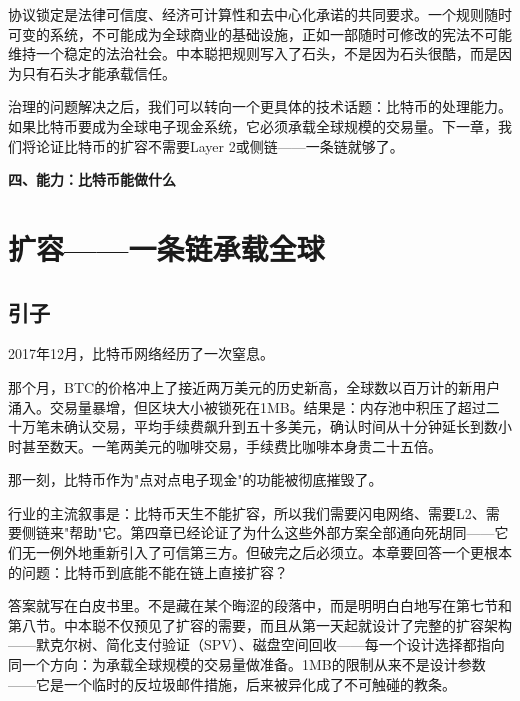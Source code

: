 \documentclass[a4paper,12pt,openany]{ctexbook}
\begin{document}
协议锁定是法律可信度、经济可计算性和去中心化承诺的共同要求。一个规则随时可变的系统，不可能成为全球商业的基础设施，正如一部随时可修改的宪法不可能维持一个稳定的法治社会。中本聪把规则写入了石头，不是因为石头很酷，而是因为只有石头才能承载信任。

治理的问题解决之后，我们可以转向一个更具体的技术话题：比特币的处理能力。如果比特币要成为全球电子现金系统，它必须承载全球规模的交易量。下一章，我们将论证比特币的扩容不需要Layer 2或侧链——一条链就够了。




\vspace{2em}
\begin{center}
{\Large\bfseries 四、能力：比特币能做什么}
\end{center}
\vspace{1em}



\chapter{扩容——一条链承载全球}



\section*{引子}


2017年12月，比特币网络经历了一次窒息。

那个月，BTC的价格冲上了接近两万美元的历史新高，全球数以百万计的新用户涌入。交易量暴增，但区块大小被锁死在1MB。结果是：内存池中积压了超过二十万笔未确认交易，平均手续费飙升到五十多美元，确认时间从十分钟延长到数小时甚至数天。一笔两美元的咖啡交易，手续费比咖啡本身贵二十五倍。

那一刻，比特币作为"点对点电子现金"的功能被彻底摧毁了。

行业的主流叙事是：比特币天生不能扩容，所以我们需要闪电网络、需要L2、需要侧链来"帮助"它。第四章已经论证了为什么这些外部方案全部通向死胡同——它们无一例外地重新引入了可信第三方。但破完之后必须立。本章要回答一个更根本的问题：比特币到底能不能在链上直接扩容？

答案就写在白皮书里。不是藏在某个晦涩的段落中，而是明明白白地写在第七节和第八节。中本聪不仅预见了扩容的需要，而且从第一天起就设计了完整的扩容架构——默克尔树、简化支付验证（SPV）、磁盘空间回收——每一个设计选择都指向同一个方向：为承载全球规模的交易量做准备。1MB的限制从来不是设计参数——它是一个临时的反垃圾邮件措施，后来被异化成了不可触碰的教条。
\end{document}

